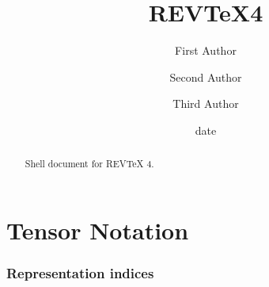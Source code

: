 \documentclass[aps,preprint]{revtex4}%
\begin{document}
\title[Short title for running header]{REV\TeX4}
\author{First Author}
\author{Second Author}
\author{Third Author}

\begin{abstract}
Shell document for REV\TeX{} 4.

\end{abstract}
\date[Date text]{date}




\maketitle
\tableofcontents


\part{Tensor Notation}

\section{Representation indices}
\end{document}
